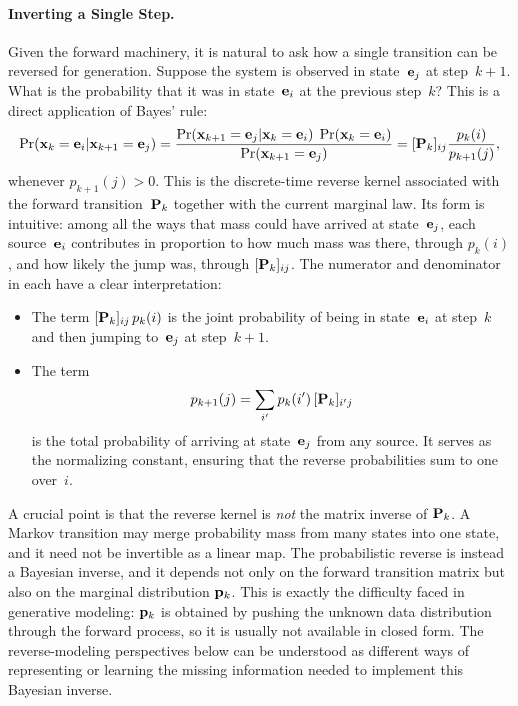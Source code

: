\paragraph{Inverting a Single Step.}
Given the forward machinery, it is natural to ask how a single
transition can be reversed for generation.  Suppose the system is observed in
state~${\mathbf{e}}_j$ at step~$k{+}1$.  What is the probability that it was in
state~${\mathbf{e}}_i$ at the previous step~$k$?  This is a direct application
of Bayes' rule:
\begin{align}
\Pr({\mathbf{x}}_k = {\mathbf{e}}_i | {\mathbf{x}}_{k+1} = {\mathbf{e}}_j)
= \frac{\Pr({\mathbf{x}}_{k+1} = {\mathbf{e}}_j | {\mathbf{x}}_k = {\mathbf{e}}_i)\;\Pr({\mathbf{x}}_k = {\mathbf{e}}_i)}
        {\Pr({\mathbf{x}}_{k+1} = {\mathbf{e}}_j)}  
= [{\mathbf{P}}_k]_{ij}\frac{p_k(i)}{p_{k+1}(j)},
\label{eq:discrete-reverse-kernel}
\end{align}
whenever $p_{k+1}(j)>0$. This is the discrete-time reverse kernel associated with the forward
transition~${\mathbf{P}}_k$ together with the current marginal law. Its form is
intuitive: among all the ways that mass could have arrived at
state~${\mathbf{e}}_j$, each source~${\mathbf{e}}_i$ contributes in proportion to how
much mass was there, through $p_k(i)$, and how likely the jump was,
through $[{\mathbf{P}}_k]_{ij}$. The numerator and denominator in  each have a clear interpretation:
\begin{itemize}[leftmargin=2em]
    \item {}
    The term $[{\mathbf{P}}_k]_{ij}\,p_k(i)$ is the joint probability of being in
    state~${\mathbf{e}}_i$ at step~$k$ and then jumping to~${\mathbf{e}}_j$ at
    step~$k{+}1$.

    \item {}
    The term
    \[
    p_{k+1}(j) = \sum_{i'} p_k(i')\,[{\mathbf{P}}_k]_{i'j}
    \]
    is the total probability of arriving at state~${\mathbf{e}}_j$ from any
    source. It serves as the normalizing constant, ensuring that the
    reverse probabilities sum to one over~$i$.
\end{itemize}

A crucial point is that the reverse kernel is \emph{not} the matrix inverse of ${\mathbf{P}}_k$. A Markov transition may merge probability mass from many states into one state, and it need not be invertible as a linear map. The probabilistic reverse is instead a Bayesian inverse, and it depends not only on the forward transition matrix but also on the marginal distribution ${\mathbf{p}}_k$. This is exactly the difficulty faced in generative modeling: ${\mathbf{p}}_k$ is obtained by pushing the unknown data distribution through the forward process, so it is usually not available in closed form.  The reverse-modeling perspectives below can be understood as different ways of representing or learning the missing information needed to implement this Bayesian inverse.

